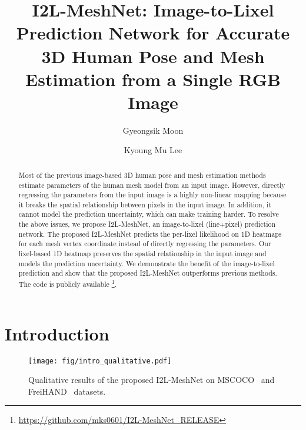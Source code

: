 \documentclass[runningheads]{llncs}
\begin{document}
\pagestyle{headings}
\mainmatter

\title{I2L-MeshNet: Image-to-Lixel Prediction Network for Accurate 3D Human Pose and Mesh Estimation from a Single RGB Image} 

\begin{comment}
\titlerunning{ECCV-20 submission ID \ECCVSubNumber} 
\authorrunning{ECCV-20 submission ID \ECCVSubNumber} 
\author{Anonymous ECCV submission}
\institute{Paper ID \ECCVSubNumber}
\end{comment}


\author{Gyeongsik Moon \and
Kyoung Mu Lee}
\maketitle

\begin{abstract}
Most of the previous image-based 3D human pose and mesh estimation methods estimate parameters of the human mesh model from an input image.
However, directly regressing the parameters from the input image is a highly non-linear mapping because it breaks the spatial relationship between pixels in the input image. 
In addition, it cannot model the prediction uncertainty, which can make training harder.
To resolve the above issues, we propose I2L-MeshNet, an image-to-lixel (line+pixel) prediction network.
The proposed I2L-MeshNet predicts the per-lixel likelihood on 1D heatmaps for each mesh vertex coordinate instead of directly regressing the parameters.
Our lixel-based 1D heatmap preserves the spatial relationship in the input image and models the prediction uncertainty.
We demonstrate the benefit of the image-to-lixel prediction and show that the proposed I2L-MeshNet outperforms previous methods.
The code is publicly available \footnote{\url{https://github.com/mks0601/I2L-MeshNet_RELEASE}}.
\end{abstract}

\section{Introduction}

\begin{figure}[t]
\begin{center}
\texttt{[image: fig/intro\_qualitative.pdf]}
\end{center}
   \caption{
   Qualitative results of the proposed I2L-MeshNet on MSCOCO~\cite{lin2014microsoft} and FreiHAND~\cite{Freihand2019} datasets.
   }
\label{fig:intro_qualitative}
\end{figure}
\end{document}
